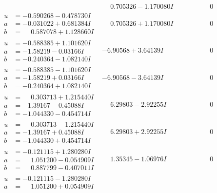 \documentclass[1p]{elsarticle_modified}
\theoremstyle{definition}
\begin{document}
$$\begin{array}{c|c|c}
 & \phantom{-}0.705326 - 1.170080 I & \phantom{-0.000000 } 0 \\ \hline\begin{aligned}
u &= -0.590268 - 0.478730 I \\
a &= -0.031022 + 0.681384 I \\
b &= \phantom{-}0.587078 + 1.128660 I\end{aligned}
 & \phantom{-}0.705326 + 1.170080 I & \phantom{-0.000000 } 0 \\ \hline\begin{aligned}
u &= -0.588385 + 1.101620 I \\
a &= -1.58219 - 0.03166 I \\
b &= -0.240364 - 1.082140 I\end{aligned}
 & -6.90568 + 3.64139 I & \phantom{-0.000000 } 0 \\ \hline\begin{aligned}
u &= -0.588385 - 1.101620 I \\
a &= -1.58219 + 0.03166 I \\
b &= -0.240364 + 1.082140 I\end{aligned}
 & -6.90568 - 3.64139 I & \phantom{-0.000000 } 0 \\ \hline\begin{aligned}
u &= \phantom{-}0.303713 + 1.215440 I \\
a &= -1.39167 - 0.45088 I \\
b &= -1.044330 - 0.454714 I\end{aligned}
 & \phantom{-}6.29803 - 2.92255 I & \phantom{-0.000000 } 0 \\ \hline\begin{aligned}
u &= \phantom{-}0.303713 - 1.215440 I \\
a &= -1.39167 + 0.45088 I \\
b &= -1.044330 + 0.454714 I\end{aligned}
 & \phantom{-}6.29803 + 2.92255 I & \phantom{-0.000000 } 0 \\ \hline\begin{aligned}
u &= -0.121115 + 1.280280 I \\
a &= \phantom{-}1.051200 - 0.054909 I \\
b &= \phantom{-}0.887799 - 0.407011 I\end{aligned}
 & \phantom{-}1.35345 - 1.06976 I & \phantom{-0.000000 } 0 \\ \hline\begin{aligned}
u &= -0.121115 - 1.280280 I \\
a &= \phantom{-}1.051200 + 0.054909 I \\

\end{aligned}
\end{array}$$
\end{document}
